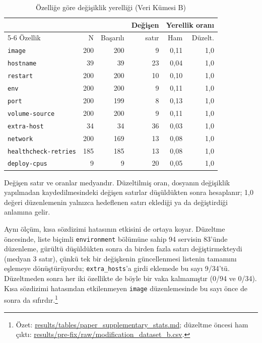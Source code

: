 \documentclass[conference]{IEEEtran}
\begin{document}
\begin{table}[t]
\caption{Özelliğe göre değişiklik yerelliği (Veri Kümesi B)}
\label{tab:locality}
\centering
\footnotesize
\setlength{\tabcolsep}{3pt}
\begin{tabular}{lrrrrr}
\toprule
 & & & Değişen & \multicolumn{2}{c}{Yerellik oranı} \\
\cmidrule(l){5-6}
Özellik & N & Başarılı & satır & Ham & Düzelt. \\
\midrule
\texttt{image} & 200 & 200 & 9 & 0,11 & 1,0 \\
\texttt{hostname} & 39 & 39 & 23 & 0,04 & 1,0 \\
\texttt{restart} & 200 & 200 & 10 & 0,10 & 1,0 \\
\texttt{env} & 200 & 200 & 9 & 0,11 & 1,0 \\
\texttt{port} & 200 & 199 & 8 & 0,13 & 1,0 \\
\texttt{volume-source} & 200 & 200 & 9 & 0,11 & 1,0 \\
\texttt{extra-host} & 34 & 34 & 36 & 0,03 & 1,0 \\
\texttt{network} & 200 & 169 & 13 & 0,08 & 1,0 \\
\texttt{healthcheck-retries} & 185 & 185 & 13 & 0,08 & 1,0 \\
\texttt{deploy-cpus} & 9 & 9 & 20 & 0,05 & 1,0 \\
\bottomrule
\end{tabular}

\smallskip
\parbox{\columnwidth}{\footnotesize Değişen satır ve oranlar medyandır.
Düzeltilmiş oran, dosyanın değişiklik yapılmadan kaydedilmesindeki
değişen satırlar düşüldükten sonra hesaplanır; 1,0 değeri düzenlemenin
yalnızca hedeflenen satırı eklediği ya da değiştirdiği anlamına gelir.}
\end{table}

Aynı ölçüm, kısa sözdizimi hatasının etkisini de ortaya koyar. Düzeltme
öncesinde, liste biçimli \texttt{environment} bölümüne sahip 94 servisin
83'ünde düzenleme, gürültü düşüldükten sonra da birden fazla satırı
değiştirmekteydi (medyan 3 satır), çünkü tek bir değişkenin güncellenmesi
listenin tamamını eşlemeye dönüştürüyordu; \texttt{extra\_hosts}'a girdi
eklemede bu sayı 9/34'tü. Düzeltmeden sonra her iki özellikte de böyle bir
vaka kalmamıştır (0/94 ve 0/34). Kısa sözdizimi hatasından etkilenmeyen
\texttt{image} düzenlemesinde bu sayı önce de sonra da sıfırdır.\footnote{Özet:
\url{results/tables/paper_supplementary_stats.md}; düzeltme öncesi ham
çıktı: \url{results/pre-fix/raw/modification_dataset_b.csv}.}
\end{document}
